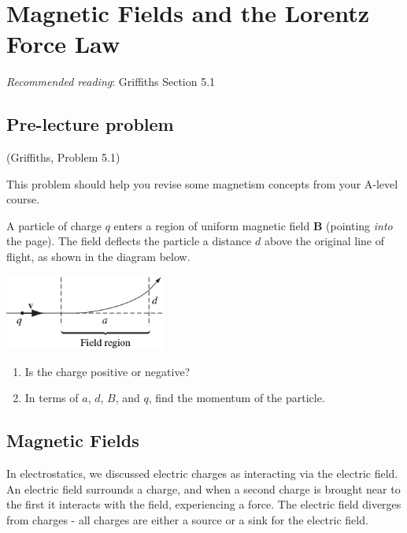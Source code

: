 \documentclass[
  letterpaper,
  DIV=11,
  numbers=noendperiod]{scrreprt}
\begin{document}

\chapter{Magnetic Fields and the Lorentz Force
Law}\label{magnetic-fields-and-the-lorentz-force-law}

\emph{Recommended reading}: Griffiths Section 5.1

\section{Pre-lecture problem}\label{pre-lecture-problem-2}

(Griffiths, Problem 5.1)

This problem should help you revise some magnetism concepts from your
A-level course.

A particle of charge \(q\) enters a region of uniform magnetic field
\(\mathrm{\mathbf{B}}\) (pointing \emph{into} the page). The field
deflects the particle a distance \(d\) above the original line of
flight, as shown in the diagram below.

\includegraphics[width=2.08333in,height=\textheight]{Figures/L4_preprob.png}

\begin{enumerate}
\def\labelenumi{(\alph{enumi})}
\item
  Is the charge positive or negative?
\item
  In terms of \(a\), \(d\), \(B\), and \(q\), find the momentum of the
  particle.
\end{enumerate}

\section{Magnetic Fields}\label{magnetic-fields}

In electrostatics, we discussed electric charges as interacting via the
electric field. An electric field surrounds a charge, and when a second
charge is brought near to the first it interacts with the field,
experiencing a force. The electric field diverges from charges - all
charges are either a source or a sink for the electric field.
\end{document}

